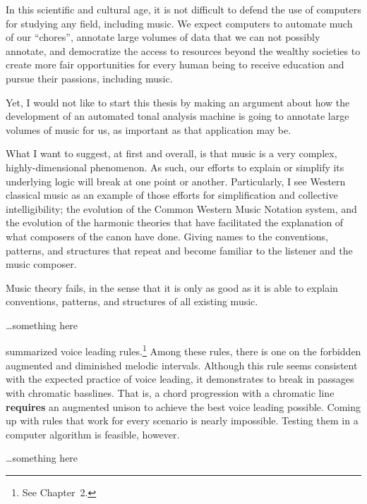 
In this scientific and cultural age, it is not difficult to
defend the use of computers for studying any field,
including music. We expect computers to automate much of our
``chores'', annotate large volumes of data that we can not
possibly annotate, and democratize the access to resources
beyond the wealthy societies to create more fair
opportunities for every human being to receive education and
pursue their passions, including music.

Yet, I would not like to start this thesis by making an
argument about how the development of an automated tonal
analysis machine is going to annotate large volumes of music
for us, as important as that application may be.

What I want to suggest, at first and overall, is that music
is a very complex, highly-dimensional phenomenon. As such,
our efforts to explain or simplify its underlying logic will
break at one point or another. Particularly, I see Western
classical music as an example of those efforts for
simplification and collective intelligibility; the evolution
of the Common Western Music Notation system, and the
evolution of the harmonic theories that have facilitated the
explanation of what composers of the canon have done. Giving
names to the conventions, patterns, and structures that
repeat and become familiar to the listener and the music
composer.

Music theory fails, in the sense that it is only as good as
it is able to explain conventions, patterns, and structures
of all existing music.

\dots something here


\textcite{huron2016voice} summarized voice leading
rules.\footnote{See Chapter~2.} Among these rules, there is
one on the forbidden augmented and diminished melodic
intervals. Although this rule seems consistent with the
expected practice of voice leading, it demonstrates to break
in passages with chromatic basslines. That is, a chord
progression with a chromatic line \textbf{requires} an
augmented unison to achieve the best voice leading possible.
Coming up with rules that work for every scenario is nearly
impossible. Testing them in a computer algorithm is
feasible, however.

\dots something here

